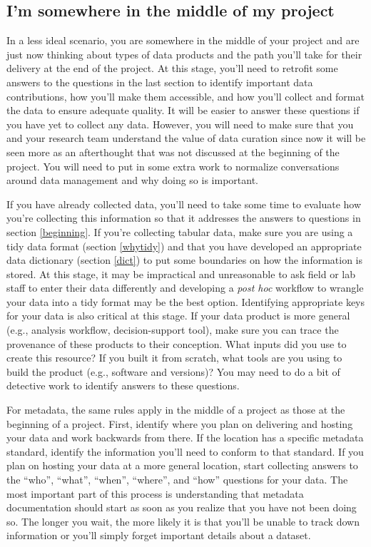 \documentclass[
]{book}
\begin{document}
\hypertarget{middleproject}{%
\subsection{I'm somewhere in the middle of my project}\label{middleproject}}

In a less ideal scenario, you are somewhere in the middle of your project and are just now thinking about types of data products and the path you'll take for their delivery at the end of the project. At this stage, you'll need to retrofit some answers to the questions in the last section to identify important data contributions, how you'll make them accessible, and how you'll collect and format the data to ensure adequate quality. It will be easier to answer these questions if you have yet to collect any data. However, you will need to make sure that you and your research team understand the value of data curation since now it will be seen more as an afterthought that was not discussed at the beginning of the project. You will need to put in some extra work to normalize conversations around data management and why doing so is important.

If you have already collected data, you'll need to take some time to evaluate how you're collecting this information so that it addresses the answers to questions in section \ref{beginning}. If you're collecting tabular data, make sure you are using a tidy data format (section \ref{whytidy}) and that you have developed an appropriate data dictionary (section \ref{dict}) to put some boundaries on how the information is stored. At this stage, it may be impractical and unreasonable to ask field or lab staff to enter their data differently and developing a \emph{post hoc} workflow to wrangle your data into a tidy format may be the best option. Identifying appropriate keys for your data is also critical at this stage. If your data product is more general (e.g., analysis workflow, decision-support tool), make sure you can trace the provenance of these products to their conception. What inputs did you use to create this resource? If you built it from scratch, what tools are you using to build the product (e.g., software and versions)? You may need to do a bit of detective work to identify answers to these questions.

For metadata, the same rules apply in the middle of a project as those at the beginning of a project. First, identify where you plan on delivering and hosting your data and work backwards from there. If the location has a specific metadata standard, identify the information you'll need to conform to that standard. If you plan on hosting your data at a more general location, start collecting answers to the ``who'', ``what'', ``when'', ``where'', and ``how'' questions for your data. The most important part of this process is understanding that metadata documentation should start as soon as you realize that you have not been doing so. The longer you wait, the more likely it is that you'll be unable to track down information or you'll simply forget important details about a dataset.
\end{document}

